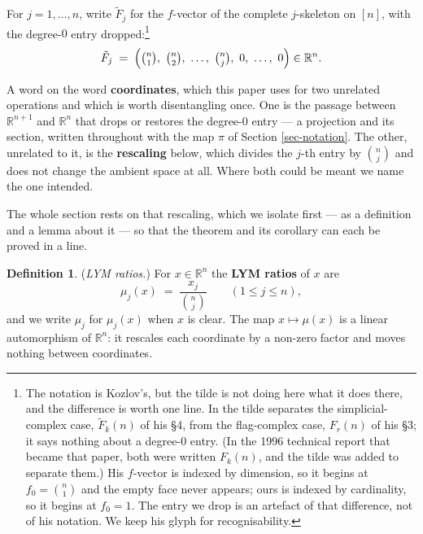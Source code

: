 \documentclass[11pt, a4paper, abstract=yes]{scrartcl}
\theoremstyle{definition}
\newtheorem{definition}{Definition}
\theoremstyle{remark}
\theoremstyle{plain}
\newcommand{\proj}{\pi}
\begin{document}
For \(j=1,\dots,n\), write \(\tilde F_j\) for the \(f\)-vector of the complete \(j\)-skeleton on
\([n]\), with the degree-\(0\) entry dropped:\footnote{The notation is Kozlov's, but the
tilde is not doing here what it does there, and the difference is worth one line. In
\cite{Kozlov1997} the tilde separates the simplicial-complex case, \(\tilde F_k(n)\) of his
\S4, from the flag-complex case, \(F_r(n)\) of his \S3; it says nothing about a degree-\(0\)
entry. (In the 1996 technical report that became that paper, both were written \(F_k(n)\), and
the tilde was added to separate them.) His \(f\)-vector is indexed by dimension, so it begins at
\(f_0=\binom n1\) and the empty face never appears; ours is indexed by cardinality, so it begins
at \(f_0=1\). The entry we drop is an artefact of that difference, not of his notation. We keep
his glyph for recognisability.}
\begin{equation}\label{eq:skeleton}
  \tilde F_j\;=\;\Bigl(\tbinom n1,\ \tbinom n2,\ \dots,\ \tbinom nj,\ 0,\ \dots,\ 0\Bigr)\in\mathbb R^n .
\end{equation}

A word on the word \textbf{coordinates}, which this paper uses for two unrelated operations and which is
worth disentangling once. One is the passage between \(\mathbb R^{n+1}\) and \(\mathbb R^n\) that
drops or restores the degree-\(0\) entry --- a projection and its section, written throughout with
the map \(\proj\) of Section \ref{sec-notation}. The other, unrelated to it, is the \textbf{rescaling} below, which
divides the \(j\)-th entry by \(\binom nj\) and does not change the ambient space at all. Where
both could be meant we name the one intended.

The whole section rests on that rescaling, which we isolate first --- as a definition and a lemma
about it --- so that the theorem and its corollary can each be proved in a line.

\begin{definition}
(\emph{LYM ratios.}) For \(x\in\mathbb R^n\) the \textbf{LYM ratios} of \(x\) are
\begin{equation}\label{eq:lym-ratios}
  \mu_j(x)\;=\;\frac{x_j}{\binom nj}\qquad(1\le j\le n),
\end{equation}
and we write \(\mu_j\) for \(\mu_j(x)\) when \(x\) is clear. The map \(x\mapsto\mu(x)\) is a
linear automorphism of \(\mathbb R^n\): it rescales each coordinate by a non-zero factor and moves
nothing between coordinates.
\label{def:lym-ratios}
\label{def-lym-ratios}
\end{definition}
\end{document}
